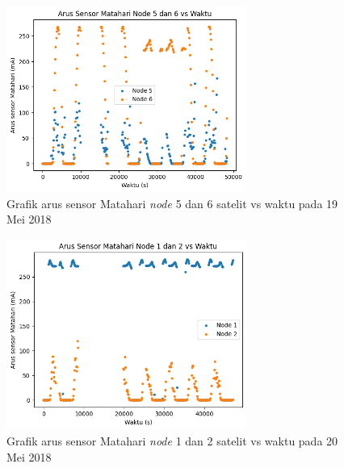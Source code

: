 \begin{figure}[H]
\setlength{}
\begin{center}
\includegraphics[width=0.7\textwidth]{fig/raw_node56_css_2018-05-19.png}
	\caption{Grafik arus sensor Matahari \textit{node} 5 dan 6 satelit vs waktu pada 19 Mei 2018}
\label{fig:rawcss5619}
\end{center}
\end{figure}

\begin{figure}[H]
\setlength{}
\begin{center}
\includegraphics[width=0.7\textwidth]{fig/raw_node12_css_2018-05-20.png}
	\caption{Grafik arus sensor Matahari \textit{node} 1 dan 2 satelit vs waktu pada 20 Mei 2018}
\label{fig:rawcss1220}
\end{center}
\end{figure}

